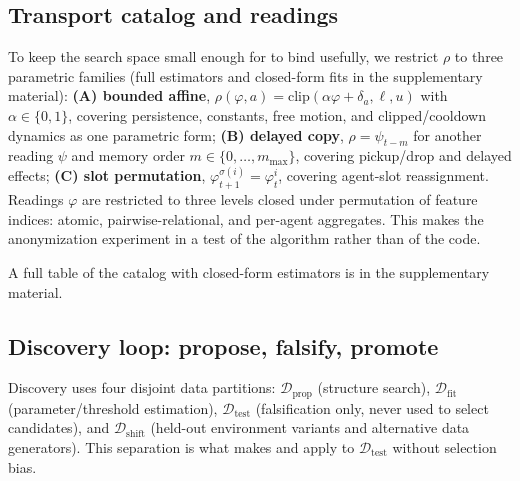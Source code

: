 \documentclass[letterpaper]{article} %
\let\autoref\Cref
\theoremstyle{plain}
\theoremstyle{definition}
\theoremstyle{remark}
\begin{document}
\subsection{Transport catalog and readings}
\label{sec:catalog}

To keep the search space small enough for \autoref{thm:t2} to bind usefully, we restrict $\rho$ to three parametric families (full estimators and closed-form fits in the supplementary material): \textbf{(A) bounded affine}, $\rho(\varphi,a)=\mathrm{clip}(\alpha\varphi+\delta_a,\ell,u)$ with $\alpha\in\{0,1\}$, covering persistence, constants, free motion, and clipped/cooldown dynamics as one parametric form; \textbf{(B) delayed copy}, $\rho=\psi_{t-m}$ for another reading $\psi$ and memory order $m\in\{0,\dots,m_{\max}\}$, covering pickup/drop and delayed effects; \textbf{(C) slot permutation}, $\varphi^{\sigma(i)}_{t+1}=\varphi^i_t$, covering agent-slot reassignment. Readings $\varphi$ are restricted to three levels closed under permutation of feature indices: atomic, pairwise-relational, and per-agent aggregates. This makes the anonymization experiment in \autoref{sec:exp} a test of the algorithm rather than of the code.

A full table of the catalog with closed-form estimators is in the supplementary material.

\subsection{Discovery loop: propose, falsify, promote}
\label{sec:loop}

Discovery uses four disjoint data partitions: $\mathcal{D}_{\mathrm{prop}}$ (structure search), $\mathcal{D}_{\mathrm{fit}}$ (parameter/threshold estimation), $\mathcal{D}_{\mathrm{test}}$ (falsification only, never used to select candidates), and $\mathcal{D}_{\mathrm{shift}}$ (held-out environment variants and alternative data generators). This separation is what makes \autoref{thm:t1} and \autoref{thm:t2} apply to $\mathcal{D}_{\mathrm{test}}$ without selection bias.
\end{document}

